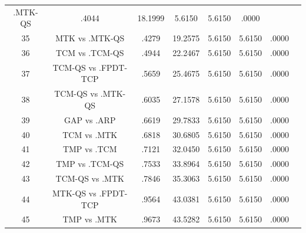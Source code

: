\documentclass[a4paper,10pt]{article}
\begin{document}
\begin{landscape}
\begin{table}[!htp]
\begin{tabular}{cccccccc}
.MTK-QS&.4044&18.1999&5.6150&5.6150&.0000\\35&MTK vs .MTK-QS&.4279&19.2575&5.6150&5.6150&.0000\\36&TCM vs .TCM-QS&.4944&22.2467&5.6150&5.6150&.0000\\37&TCM-QS vs .FPDT-TCP&.5659&25.4675&5.6150&5.6150&.0000\\38&TCM-QS vs .MTK-QS&.6035&27.1578&5.6150&5.6150&.0000\\39&GAP vs .ARP&.6619&29.7833&5.6150&5.6150&.0000\\40&TCM vs .MTK&.6818&30.6805&5.6150&5.6150&.0000\\41&TMP vs .TCM&.7121&32.0450&5.6150&5.6150&.0000\\42&TMP vs .TCM-QS&.7533&33.8964&5.6150&5.6150&.0000\\43&TCM-QS vs .MTK&.7846&35.3063&5.6150&5.6150&.0000\\44&MTK-QS vs .FPDT-TCP&.9564&43.0381&5.6150&5.6150&.0000\\45&TMP vs .MTK&.9673&43.5282&5.6150&5.6150&.0000\\\hline
\end{tabular}
\end{table}

\end{landscape}
\end{document}
